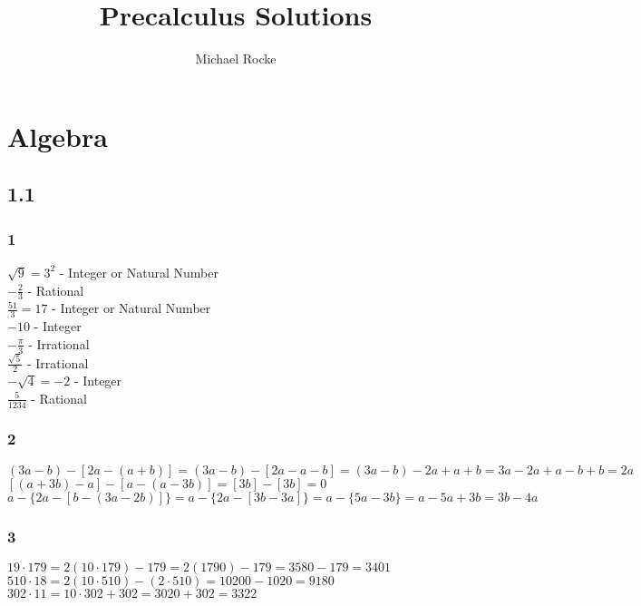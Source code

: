 \documentclass[]{report}
\title{Precalculus Solutions}
\author{Michael Rocke}
\begin{document}
\maketitle

\section{Algebra}

\subsection{1.1}

\subsubsection{1}
$\sqrt{9} = 3^2$ - Integer or Natural Number\\
$-\frac{2}{3}$ - Rational \\
$ \frac{51}{3} = 17 $ - Integer or Natural Number \\
$ -10 $ - Integer \\
$ -\frac{\pi}{3} $ - Irrational \\
$ \frac{\sqrt{5}}{2} $ - Irrational \\
$ - \sqrt{4} = -2 $ - Integer \\
$ \frac{5}{1234} $ - Rational 

\subsubsection{2}
$ (3a - b)  - [2a - (a + b)] = (3a - b) - [2a - a - b] = (3a - b) - 2a + a + b = 3a - 2a + a - b + b = 2a $ \\


$ [(a + 3b) -a] - [a - (a - 3b)] =  [3b] -  [3b] = 0 $ \\



$ a - \{2a - [b - (3a - 2b)]\} = a  - \{2a - [3b - 3a]\} = a  - \{5a - 3b\} = a - 5a + 3b = 3b - 4a $

\subsubsection{3}
$ 19 \cdot 179 = 2(10 \cdot 179) - 179 = 2(1790) - 179 = 3580 - 179 = 3401 $ \\
$ 510 \cdot 18 = 2(10 \cdot 510) - (2 \cdot 510) = 10200 - 1020 = 9180 $ \\
$ 302 \cdot 11 = 10\cdot 302 + 302 = 3020 + 302 = 3322 $ \\
\end{document}
